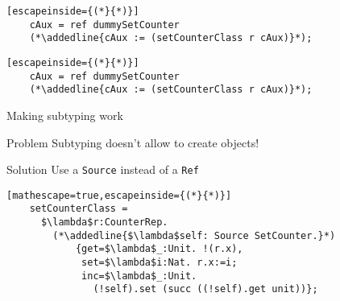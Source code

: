 \documentclass[presentation,xcolor=svgnames]{beamer}
\begin{document}
\begin{frame}[fragile]
  \begin{lstlisting}[escapeinside={(*}{*)}]
    cAux = ref dummySetCounter
    (*\addedline{cAux := (setCounterClass r cAux)}*);
  \end{lstlisting}

  \begin{center}
  \end{center}

\end{frame}

\begin{frame}[fragile]
  \begin{lstlisting}[escapeinside={(*}{*)}]
    cAux = ref dummySetCounter
    (*\addedline{cAux := (setCounterClass r cAux)}*);
  \end{lstlisting}

  \begin{center}
  \end{center}

\end{frame}

\begin{frame}[fragile]{Making subtyping work}
  \begin{block}{Problem}
    Subtyping doesn't allow to create objects!
  \end{block}

  \begin{block}{Solution}
    Use a \texttt{Source} instead of a \texttt{Ref}
  \end{block}

  \begin{lstlisting}[mathescape=true,escapeinside={(*}{*)}]
    setCounterClass =
      $\lambda$r:CounterRep.
        (*\addedline{$\lambda$self: Source SetCounter.}*)
            {get=$\lambda$_:Unit. !(r.x),
             set=$\lambda$i:Nat. r.x:=i;
             inc=$\lambda$_:Unit.
               (!self).set (succ ((!self).get unit))};
  \end{lstlisting}

\end{frame}
\end{document}

